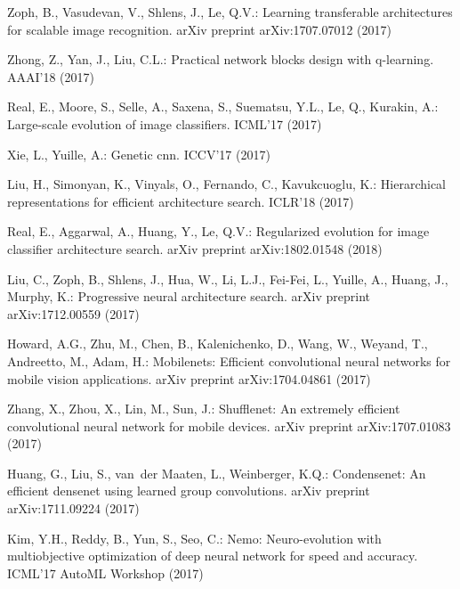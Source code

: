 \documentclass[runningheads]{llncs}
\begin{document}
\begin{thebibliography}{10}
Zoph, B., Vasudevan, V., Shlens, J., Le, Q.V.:
\newblock Learning transferable architectures for scalable image recognition.
\newblock arXiv preprint arXiv:1707.07012 (2017)

Zhong, Z., Yan, J., Liu, C.L.:
\newblock Practical network blocks design with q-learning.
\newblock AAAI'18 (2017)

Real, E., Moore, S., Selle, A., Saxena, S., Suematsu, Y.L., Le, Q., Kurakin,
  A.:
\newblock Large-scale evolution of image classifiers.
\newblock ICML'17 (2017)

Xie, L., Yuille, A.:
\newblock Genetic cnn.
\newblock ICCV'17 (2017)

Liu, H., Simonyan, K., Vinyals, O., Fernando, C., Kavukcuoglu, K.:
\newblock Hierarchical representations for efficient architecture search.
\newblock ICLR'18 (2017)

Real, E., Aggarwal, A., Huang, Y., Le, Q.V.:
\newblock Regularized evolution for image classifier architecture search.
\newblock arXiv preprint arXiv:1802.01548 (2018)

Liu, C., Zoph, B., Shlens, J., Hua, W., Li, L.J., Fei-Fei, L., Yuille, A.,
  Huang, J., Murphy, K.:
\newblock Progressive neural architecture search.
\newblock arXiv preprint arXiv:1712.00559 (2017)

Howard, A.G., Zhu, M., Chen, B., Kalenichenko, D., Wang, W., Weyand, T.,
  Andreetto, M., Adam, H.:
\newblock Mobilenets: Efficient convolutional neural networks for mobile vision
  applications.
\newblock arXiv preprint arXiv:1704.04861 (2017)

Zhang, X., Zhou, X., Lin, M., Sun, J.:
\newblock Shufflenet: An extremely efficient convolutional neural network for
  mobile devices.
\newblock arXiv preprint arXiv:1707.01083 (2017)

Huang, G., Liu, S., van~der Maaten, L., Weinberger, K.Q.:
\newblock Condensenet: An efficient densenet using learned group convolutions.
\newblock arXiv preprint arXiv:1711.09224 (2017)

Kim, Y.H., Reddy, B., Yun, S., Seo, C.:
\newblock Nemo: Neuro-evolution with multiobjective optimization of deep neural
  network for speed and accuracy.
\newblock ICML'17 AutoML Workshop (2017)


\end{thebibliography}
\end{document}
